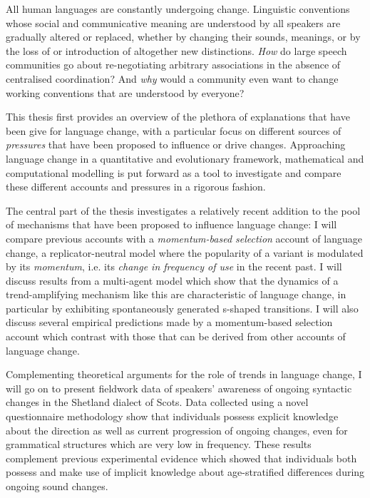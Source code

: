 All human languages are constantly undergoing change. Linguistic conventions whose social and communicative meaning are understood by all speakers are gradually altered or replaced, whether by changing their sounds, meanings, or by the loss of or introduction of altogether new distinctions. \emph{How} do large speech communities go about re-negotiating arbitrary associations in the absence of centralised coordination? And \emph{why} would a community even want to change working conventions that are understood by everyone?

This thesis first provides an overview of the plethora of explanations that have been give for language change, with a particular focus on different sources of \emph{pressures} that have been proposed to influence or drive changes. Approaching language change in a quantitative and evolutionary framework, mathematical and computational modelling is put forward as a tool to investigate and compare these different accounts and pressures in a rigorous fashion.

The central part of the thesis investigates a relatively recent addition to the pool of mechanisms that have been proposed to influence language change: I will compare previous accounts with a \emph{momentum-based selection} account of language change, a replicator-neutral model where the popularity of a variant is modulated by its \emph{momentum}, i.e. its \emph{change in frequency of use} in the recent past. I will discuss results from a multi-agent model which show that the dynamics of a trend-amplifying mechanism like this are characteristic of language change, in particular by exhibiting spontaneously generated s-shaped transitions. I will also discuss several empirical predictions made by a momentum-based selection account which contrast with those that can be derived from other accounts of language change.

Complementing theoretical arguments for the role of trends in language change, I will go on to present fieldwork data of speakers' awareness of ongoing syntactic changes in the Shetland dialect of Scots. Data collected using a novel questionnaire methodology show that individuals possess explicit knowledge about the direction as well as current progression of ongoing changes, even for grammatical structures which are very low in frequency. These results complement previous experimental evidence which showed that individuals both possess and make use of implicit knowledge about age-stratified differences during ongoing sound changes.%

